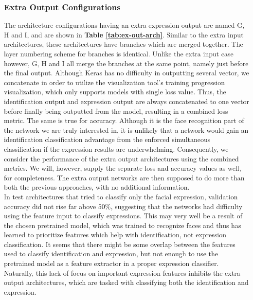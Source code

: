 \subsubsection{Extra Output Configurations}

The architecture configurations having an extra expression output are named G, H and I, and are shown in \textbf{Table \ref{tab:ex-out-arch}}. Similar to the extra input architectures, these architectures have branches which are merged together. The layer numbering scheme for branches is identical. Unlike the extra input case however, G, H and I all merge the branches at the same point, namely just before the final output. Although Keras has no difficulty in outputting several vector, we concatenate in order to utilize the visualization tool's training progression visualization, which only supports models with single loss value. Thus, the identification output and expression output are always concatenated to one vector before finally being outputted from the model, resulting in a combined loss metric. The same is true for accuracy. Although it is the face recognition part of the network we are truly interested in, it is unlikely that a network would gain an identification classification advantage from the enforced simultaneous classification if the expression results are underwhelming. Consequently, we consider the performance of the extra output architectures using the combined metrics. We will, however, supply the separate loss and accuracy values as well, for completeness. The extra output networks are then supposed to do more than both the previous approaches, with no additional information. \\

\noindent In test architectures that tried to classify only the facial expression, validation accuracy did not rise far above 50\%, suggesting that the networks had difficulty using the feature input to classify expressions. This may very well be a result of the chosen pretrained model, which was trained to recognize faces and thus has learned to prioritize features which help with identification, not expression classification. It seems that there might be some overlap between the features used to classify identification and expression, but not enough to use the pretrained model as a feature extractor in a proper expression classifier. Naturally, this lack of focus on important expression features inhibits the extra output architectures, which are tasked with classifying both the identification and expression. \\

